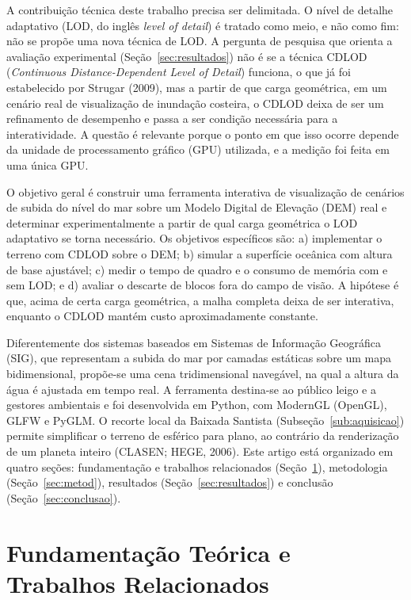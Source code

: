 \documentclass[conference]{IEEEtran}
\begin{document}
A contribuição técnica deste trabalho precisa ser delimitada. O nível de
detalhe adaptativo (LOD, do inglês \emph{level of detail}) é tratado como
meio, e não como fim: não se propõe uma nova técnica de LOD. A pergunta de
pesquisa que orienta a avaliação experimental (Seção~\ref{sec:resultados})
não é se a técnica CDLOD (\emph{Continuous Distance-Dependent Level of
Detail}) funciona, o que já foi estabelecido por Strugar (2009),
mas a partir de que carga geométrica, em um cenário real de visualização
de inundação costeira, o CDLOD deixa de ser um refinamento de desempenho e
passa a ser condição necessária para a interatividade. A questão é relevante porque o ponto em que isso ocorre depende da unidade de processamento gráfico (GPU) utilizada, e a medição foi feita em uma única GPU.

O objetivo geral é construir uma ferramenta interativa de visualização de
cenários de subida do nível do mar sobre um Modelo Digital de Elevação
(DEM) real e determinar experimentalmente a partir de qual carga geométrica
o LOD adaptativo se torna necessário. Os objetivos específicos são: a)
implementar o terreno com CDLOD sobre o DEM; b) simular a superfície
oceânica com altura de base ajustável; c) medir o tempo de quadro e o
consumo de memória com e sem LOD; e d) avaliar o descarte de blocos fora do campo de visão. A hipótese é que, acima de certa carga geométrica, a malha completa deixa de ser interativa, enquanto o CDLOD mantém custo aproximadamente constante.

Diferentemente dos sistemas baseados em Sistemas de Informação Geográfica
(SIG), que representam a subida do mar por camadas estáticas sobre um mapa
bidimensional, propõe-se uma cena tridimensional navegável, na qual a altura
da água é ajustada em tempo real. A ferramenta destina-se ao público leigo e
a gestores ambientais e foi desenvolvida em Python, com ModernGL (OpenGL),
GLFW e PyGLM. O recorte local da Baixada Santista (Subseção~\ref{sub:aquisicao}) permite simplificar o terreno de esférico para plano, ao contrário da renderização de um planeta inteiro (CLASEN; HEGE, 2006). Este artigo está organizado em quatro seções: fundamentação e
trabalhos relacionados (Seção~\ref{sec:fund}), metodologia
(Seção~\ref{sec:metod}), resultados (Seção~\ref{sec:resultados}) e
conclusão (Seção~\ref{sec:conclusao}).

\section{Fundamentação Teórica e Trabalhos Relacionados}
\label{sec:fund}
\end{document}
